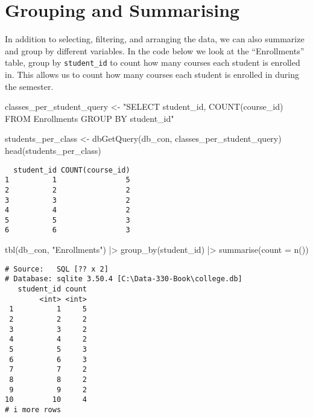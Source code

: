 \documentclass[
  letterpaper,
  DIV=11,
  numbers=noendperiod]{scrreprt}
\newenvironment{Shaded}{\begin{snugshade}}{\end{snugshade}}
\newcommand{\AttributeTok}[1]{\textcolor[rgb]{0.40,0.45,0.13}{#1}}
\newcommand{\FunctionTok}[1]{\textcolor[rgb]{0.28,0.35,0.67}{#1}}
\newcommand{\NormalTok}[1]{\textcolor[rgb]{0.00,0.23,0.31}{#1}}
\newcommand{\OtherTok}[1]{\textcolor[rgb]{0.00,0.23,0.31}{#1}}
\newcommand{\SpecialCharTok}[1]{\textcolor[rgb]{0.37,0.37,0.37}{#1}}
\newcommand{\StringTok}[1]{\textcolor[rgb]{0.13,0.47,0.30}{#1}}
\begin{document}
\section{Grouping and Summarising}\label{grouping-and-summarising}

In addition to selecting, filtering, and arranging the data, we can also
summarize and group by different variables. In the code below we look at
the ``Enrollments'' table, group by \texttt{student\_id} to count how
many courses each student is enrolled in. This allows us to count how
many courses each student is enrolled in during the semester.

\begin{Shaded}
\begin{Highlighting}[]
\NormalTok{classes\_per\_student\_query }\OtherTok{\textless{}{-}} \StringTok{"SELECT student\_id, COUNT(course\_id)}
\StringTok{                              FROM Enrollments}
\StringTok{                              GROUP BY student\_id"}

\NormalTok{students\_per\_class }\OtherTok{\textless{}{-}} \FunctionTok{dbGetQuery}\NormalTok{(db\_con, classes\_per\_student\_query)}
\FunctionTok{head}\NormalTok{(students\_per\_class)}
\end{Highlighting}
\end{Shaded}

\begin{verbatim}
  student_id COUNT(course_id)
1          1                5
2          2                2
3          3                2
4          4                2
5          5                3
6          6                3
\end{verbatim}

\begin{Shaded}
\begin{Highlighting}[]
\FunctionTok{tbl}\NormalTok{(db\_con, }\StringTok{"Enrollments"}\NormalTok{) }\SpecialCharTok{|\textgreater{}} 
  \FunctionTok{group\_by}\NormalTok{(student\_id) }\SpecialCharTok{|\textgreater{}}
  \FunctionTok{summarise}\NormalTok{(}\AttributeTok{count =} \FunctionTok{n}\NormalTok{())}
\end{Highlighting}
\end{Shaded}

\begin{verbatim}
# Source:   SQL [?? x 2]
# Database: sqlite 3.50.4 [C:\Data-330-Book\college.db]
   student_id count
        <int> <int>
 1          1     5
 2          2     2
 3          3     2
 4          4     2
 5          5     3
 6          6     3
 7          7     2
 8          8     2
 9          9     2
10         10     4
# i more rows
\end{verbatim}
\end{document}
